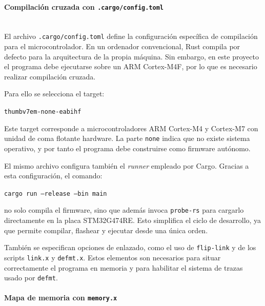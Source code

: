 \documentclass[11pt,a4paper]{article}
\newcommand{\myparagraph}[1]{\paragraph{#1}\mbox{}\\}
\begin{document}
\myparagraph{Compilación cruzada con \texttt{.cargo/config.toml}}

El archivo \texttt{.cargo/config.toml} define la configuración específica de compilación para el microcontrolador. En un ordenador convencional, Rust compila por defecto para la arquitectura de la propia máquina. Sin embargo, en este proyecto el programa debe ejecutarse sobre un ARM Cortex-M4F, por lo que es necesario realizar compilación cruzada.

Para ello se selecciona el target:

\begin{center}
\texttt{thumbv7em-none-eabihf}
\end{center}

Este target corresponde a microcontroladores ARM Cortex-M4 y Cortex-M7 con unidad de coma flotante hardware. La parte \texttt{none} indica que no existe sistema operativo, y por tanto el programa debe construirse como firmware autónomo.

El mismo archivo configura también el \textit{runner} empleado por Cargo. Gracias a esta configuración, el comando:

\begin{center}
\texttt{cargo run --release --bin main}
\end{center}

no solo compila el firmware, sino que además invoca \texttt{probe-rs} para cargarlo directamente en la placa STM32G474RE. Esto simplifica el ciclo de desarrollo, ya que permite compilar, flashear y ejecutar desde una única orden.

También se especifican opciones de enlazado, como el uso de \texttt{flip-link} y de los scripts \texttt{link.x} y \texttt{defmt.x}. Estos elementos son necesarios para situar correctamente el programa en memoria y para habilitar el sistema de trazas usado por \texttt{defmt}.

\myparagraph{Mapa de memoria con \texttt{memory.x}}



\end{document}
